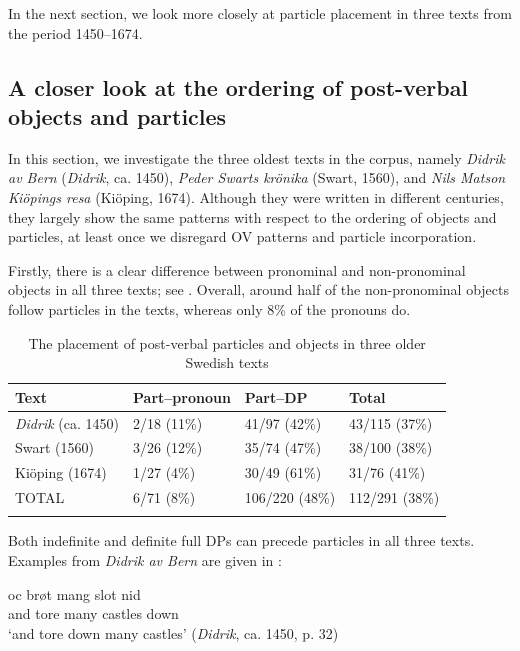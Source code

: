 \documentclass[output=paper]{langscibook}
\begin{document}
In the next section, we look more closely at particle placement in three texts from the period 1450–1674.


\subsection{A closer look at the ordering of post-verbal objects and particles}\label{sec:lalu:4.2}

In this section, we investigate the three oldest texts in the corpus, namely \textit{Didrik av Bern} (\textit{Didrik}, ca. 1450), \textit{Peder Swarts krönika} (Swart, 1560), and \textit{Nils Matson Kiöpings resa} (Kiöping, 1674). Although they were written in different centuries, they largely show the same patterns with respect to the ordering of objects and particles, at least once we disregard OV patterns and particle incorporation. 



Firstly, there is a clear difference between pronominal and non-pronominal objects in all three texts; see . Overall, around half of the non-pronominal objects follow particles in the texts, whereas only 8\% of the pronouns do.


\begin{table}
\caption{The placement of post-verbal particles and objects in three older Swedish texts}
\label{tab:lalu:1}
\begin{tabularx}{.9\textwidth}{lXXX}
\lsptoprule
Text & Part--pronoun & Part–DP & Total\\
\midrule
\textit{Didrik} (ca. 1450) & 2/18 (11\%) & 41/97 (42\%) & 43/115 (37\%)\\
Swart (1560) & 3/26 (12\%) & 35/74 (47\%) & 38/100 (38\%)\\
Kiöping (1674) & 1/27 (4\%) & 30/49 (61\%) & 31/76 (41\%)\\
\midrule
TOTAL & 6/71 (8\%) & 106/220 (48\%) & 112/291 (38\%)\\
\lspbottomrule
\end{tabularx}
\end{table}

Both indefinite and definite full DPs can precede particles in all three texts. Examples from \textit{Didrik av Bern} are given in :


\ea\label{ex:lalu:23}
\ea
\gll  oc     brøt   mang   slot       nid\\
    and     tore   many   castles   down \\
\glt `and tore down many castles’ (\textit{Didrik}, ca. 1450, p. 32)\\
\end{document}
